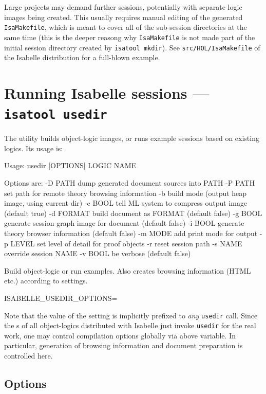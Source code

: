 \medskip Large projects may demand further sessions, potentially with separate
logic images being created.  This usually requires manual editing of the
generated \texttt{IsaMakefile}, which is meant to cover all of the sub-session
directories at the same time (this is the deeper reasong why
\texttt{IsaMakefile} is not made part of the initial session directory created
by \texttt{isatool mkdir}).  See \texttt{src/HOL/IsaMakefile} of the Isabelle
distribution for a full-blown example.


\section{Running Isabelle sessions --- \texttt{isatool usedir}} \label{sec:tool-usedir}

The  utility builds object-logic images, or runs example
sessions based on existing logics. Its usage is:
\begin{ttbox}

Usage: usedir [OPTIONS] LOGIC NAME

  Options are:
    -D PATH      dump generated document sources into PATH
    -P PATH      set path for remote theory browsing information
    -b           build mode (output heap image, using current dir)
    -c BOOL      tell ML system to compress output image (default true)
    -d FORMAT    build document as FORMAT (default false)
    -g BOOL      generate session graph image for document (default false)
    -i BOOL      generate theory browser information (default false)
    -m MODE      add print mode for output
    -p LEVEL     set level of detail for proof objects
    -r           reset session path
    -s NAME      override session NAME
    -v BOOL      be verbose (default false)

  Build object-logic or run examples. Also creates browsing
  information (HTML etc.) according to settings.

  ISABELLE_USEDIR_OPTIONS=
\end{ttbox}

Note that the value of the  setting is
implicitly prefixed to \emph{any} \texttt{usedir} call. Since the
s of all object-logics distributed with Isabelle just
invoke \texttt{usedir} for the real work, one may control compilation options
globally via above variable. In particular, generation of 
browsing information and document preparation is controlled here.


\subsection*{Options}

